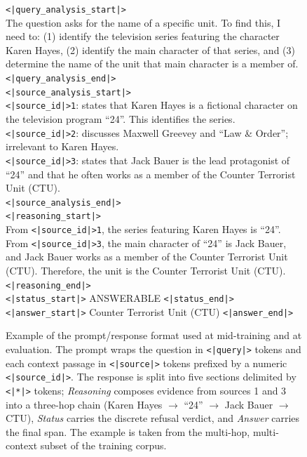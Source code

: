 \documentclass{llmxive}
\providecommand{\rtok}[1]{{\texttt{<|#1|>}}}
\providecommand{\srcid}[1]{{\texttt{<|source\_id|>#1}}}
\begin{document}
\begin{figure}[htbp]
\begin{tcolorbox}[
    colback=gray!5!white,
    colframe=gray!75!black,
    title=Response,
    fonttitle=\bfseries,
    breakable,
    enhanced,
    fontupper=\ttfamily\footnotesize,
]
\rtok{query\_analysis\_start}\\
The question asks for the name of a specific unit. To find this, I need to: (1) identify the television series featuring the character Karen Hayes, (2) identify the main character of that series, and (3) determine the name of the unit that main character is a member of.\\
\rtok{query\_analysis\_end}\\[2pt]
\rtok{source\_analysis\_start}\\
\srcid{1}: states that Karen Hayes is a fictional character on the television program ``24''. This identifies the series.\\
\srcid{2}: discusses Maxwell Greevey and ``Law \& Order''; irrelevant to Karen Hayes.\\
\srcid{3}: states that Jack Bauer is the lead protagonist of ``24'' and that he often works as a member of the Counter Terrorist Unit (CTU).\\
\rtok{source\_analysis\_end}\\[2pt]
\rtok{reasoning\_start}\\
From \srcid{1}, the series featuring Karen Hayes is ``24''. From \srcid{3}, the main character of ``24'' is Jack Bauer, and Jack Bauer works as a member of the Counter Terrorist Unit (CTU). Therefore, the unit is the Counter Terrorist Unit (CTU).\\
\rtok{reasoning\_end}\\[2pt]
\rtok{status\_start} ANSWERABLE \rtok{status\_end}\\[2pt]
\rtok{answer\_start} Counter Terrorist Unit (CTU) \rtok{answer\_end}
\end{tcolorbox}
\caption{Example of the prompt/response format used at mid-training and at evaluation. The prompt wraps the question in {\texttt{<|query|>}} tokens and each context passage in {\texttt{<|source|>}} tokens prefixed by a numeric {\texttt{<|source\_id|>}}. The response is split into five sections delimited by {\texttt{<|*|>}} tokens; \emph{Reasoning} composes evidence from sources 1 and 3 into a three-hop chain (Karen Hayes $\rightarrow$ ``24'' $\rightarrow$ Jack Bauer $\rightarrow$ CTU), \emph{Status} carries the discrete refusal verdict, and \emph{Answer} carries the final span. The example is taken from the multi-hop, multi-context subset of the training corpus.}
\label{fig:trace-training-example}
\end{figure}
\end{document}
